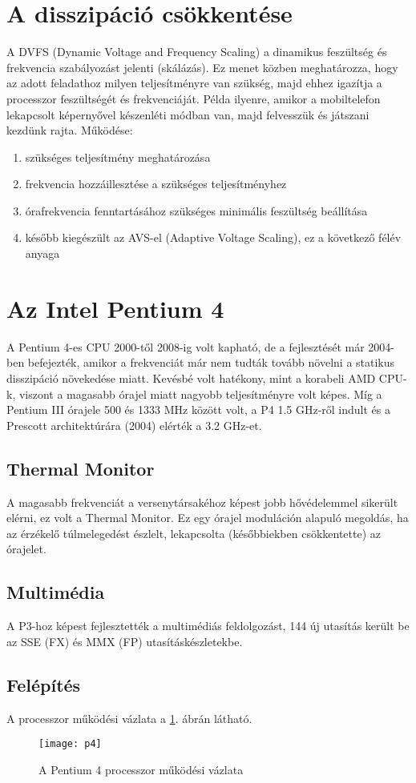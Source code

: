 \section{A disszipáció csökkentése}
A DVFS (Dynamic Voltage and Frequency Scaling) a dinamikus feszültség és frekvencia szabályozást jelenti (skálázás).
Ez menet közben meghatározza, hogy az adott feladathoz milyen teljesítményre van szükség, majd ehhez igazítja a processzor feszültségét és frekvenciáját.
Példa ilyenre, amikor a mobiltelefon lekapcsolt képernyővel készenléti módban van, majd felvesszük és játszani kezdünk rajta.
Működése:
\begin{enumerate}
    \item szükséges teljesítmény meghatározása
    \item frekvencia hozzáillesztése a szükséges teljesítményhez
    \item órafrekvencia fenntartásához szükséges minimális feszültség beállítása
    \item később kiegészült az AVS-el (Adaptive Voltage Scaling), ez a következő félév anyaga
\end{enumerate}

\section{Az Intel Pentium 4}
A Pentium 4-es CPU 2000-től 2008-ig volt kapható, de a fejlesztését már 2004-ben befejezték, amikor a frekvenciát már nem tudták tovább növelni a statikus disszipáció növekedése miatt.
Kevésbé volt hatékony, mint a korabeli AMD CPU-k, viszont a magasabb órajel miatt nagyobb teljesítményre volt képes.
Míg a Pentium III órajele 500 és 1333 MHz között volt, a P4 1.5 GHz-ről indult és a Prescott architektúrára (2004) elérték a 3.2 GHz-et.

\subsection{Thermal Monitor}
A magasabb frekvenciát a versenytársakéhoz képest jobb hővédelemmel sikerült elérni, ez volt a Thermal Monitor.
Ez egy órajel moduláción alapuló megoldás, ha az érzékelő túlmelegedést észlelt, lekapcsolta (későbbiekben csökkentette) az órajelet.

\subsection{Multimédia}
A P3-hoz képest fejlesztették a multimédiás feldolgozást, 144 új utasítás került be az SSE (FX) és MMX (FP) utasításkészletekbe.

\subsection{Felépítés}
A processzor működési vázlata a \ref{fig:p4}. ábrán látható.
\begin{figure}[H]
    \texttt{[image: p4]}
    \centering
    \caption{A Pentium 4 processzor működési vázlata}
    \label{fig:p4}
\end{figure}